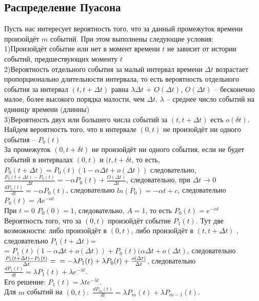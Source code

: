 \documentclass[russian, 12pt, fleqn]{article}
\begin{document}
\subsection{Распределение Пуасона}
Пусть нас интересует вероятность того, что за данный промежуток времени произойдёт $m$ событий. При этом выполнены следующие условия:\\
1)Произойдёт событие или нет в момент времени $t$ не зависит от истории событий, предшествующих моменту $t$\\
2)Вероятность отдельного события за малый интервал времени $\Delta t$ возрастает пропорционально длительности интервала, то есть вероятность отдельного события за интервал $(t, t + \Delta t)$ равна $\lambda \Delta t$ + $O(\Delta t)$, $O(\Delta t)$ -- бесконечно малое, более высокого порядка малости, чем $\Delta t$. $\lambda$  -- среднее число событий на единицу времени (длинны)\\
3)Вероятность двух или большего числа событий за $(t, t + \Delta t)$ есть $o(\delta t)$.\\
Найдем вероятность того, что в интервале $(0, t)$ не произойдёт ни одного события -- $P_0(t)$\\
За промежуток $(0, t + \delta t)$ не произойдёт ни одного события, если не будет событий в интервалах $(0, t)$ и $(t, t+\delta t$, то есть,
$P_0(t+\Delta t) = P_0(t)(1-\alpha\Delta t + o(\Delta t))$ следовательно, $\frac{P_0(t+\Delta t) - P_0(t)}{\Delta t} = -\alpha P_0(t) + \frac{O(\Delta t)}{\Delta t}$, следовательно, при $\Delta   t  \rightarrow 0$ $\frac{dP_0(t)}{dt}  = -\alpha P_0(t)$, следовательно $ln(P_0) = -\alpha t + c$, следовательно $P_0(t) = Ae^{-\alpha t}$\\
При $t = 0$ $P_0(0)  = 1$, следовательно, $A = 1$, то есть $P_0(t) = e^{-\alpha t}$\\
Вероятность того, что за $(0, t)$ произойдёт событие $P_1(t)$. 
Тут две возможности: либо произойдёт в $(0, t)$, либо произойдёт в $(t, t + \Delta t)$ , следовательно $P_1(t+\Delta t)$=\\= $P_1(t)(1-\alpha \Delta t + o(\Delta t)) + P_0(t)(\alpha \Delta t + o(\Delta t)$,
 следовательно $\frac{P_1(t+\Delta t) - P_1(t)}{\Delta t} =\\= -\lambda P_1(t) + \lambda P_0(t) + \frac{o(\Delta t)}{\Delta t}$,  следовательно $\frac{dP_1(t)}{dt}  = \lambda P_1(t) + \lambda e^{-\lambda t}$.\\
 Его решение: $P_1(t) = \lambda t e^{-\lambda t}$.\\
Для $m$ событий на $(0, t):$
$\frac{dP_m(t)}{dt} = \lambda P_m(t) + \lambda P_{m-1}(t)$.\\
\end{document}
